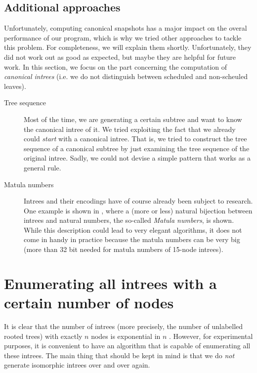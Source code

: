 
\subsection{Additional approaches}
\label{sec:algorithm-canonical-snap-additional-approaches}

Unfortunately, computing canonical snapshots has a major impact on the overal performance of our program, which is why we tried other approaches to tackle this problem. For completeness, we will explain them shortly. Unfortunately, they did not work out as good as expected, but maybe they are helpful for future work. In this section, we focus on the part concerning the computation of \emph{canonical intrees} (i.e. we do not distinguish between scheduled and non-scheuled leaves).

\begin{description}
\item[Tree sequence] Most of the time, we are generating a certain subtree and want to know the canonical intree of it. We tried exploiting the fact that we already could \emph{start} with a canonical intree. That is, we tried to construct the tree sequence of a canonical subtree by just examining the tree sequence of the original intree. Sadly, we could not devise a simple pattern that works as a general rule.
\item[Matula numbers] Intrees and their encodings have of course already been subject to research. One example is shown in \cite{matula1968natural}, where a (more or less) natural bijection between intrees and natural numbers, the so-called \emph{Matula numbers}, is shown. While this description could lead to very elegant algorithms, it does not come in handy in practice because the matula numbers can be very big (more than 32 bit needed for matula numbers of 15-node intrees).
\end{description}

\section{Enumerating all intrees with a certain number of nodes}
\label{sec:enumerating-all-intrees}

It is clear that the number of intrees (more precisely, the number of unlabelled rooted trees) with exactly $n$ nodes is exponential in $n$ . However, for experimental purposes, it is convenient to have an algorithm that is capable of enumerating all these intrees. The main thing that should be kept in mind is that we do \emph{not} generate isomorphic intrees over and over again.

